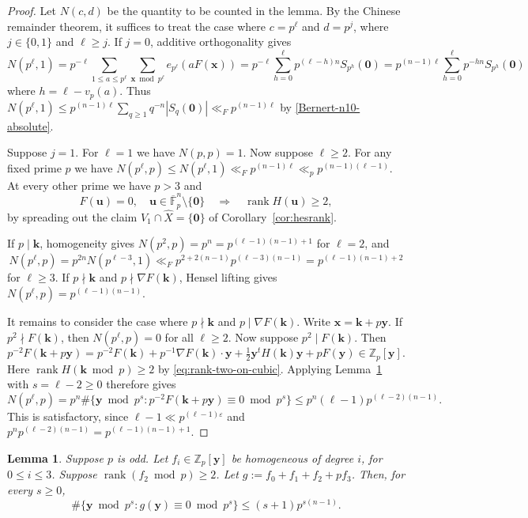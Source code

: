 \documentclass[a4paper,11pt, twoside,reqno]{amsart}
\theoremstyle{plain}
\newtheorem{lemma}[thm]{Lemma}
\theoremstyle{definition}
\theoremstyle{remark}
\newcommand{\bfx}{\bm{x}}
\newcommand{\bfy}{\bm{y}}
\newcommand{\ZZ}{\mathbb{Z}}
\DeclareMathOperator{\rank}{rank}
\renewcommand{\bar}{\overline}
\newcommand{\ve}{\varepsilon}
\renewcommand{\le}{\leqslant}
\renewcommand{\ge}{\geqslant}
\newcommand{\FF}{\mathbb{F}}
\newcommand{\cone}{\widehat}
\numberwithin{equation}{section}
\begin{document}
\begin{proof}
Let $N(c,d)$ be the quantity to be counted in the lemma.
By the Chinese remainder theorem, it suffices to treat the case where
$c=p^\ell$ and $d=p^j$, where $j\in\{0,1\}$ and $\ell\ge j$.
If $j=0$, additive orthogonality gives
\begin{equation*}
N(p^\ell,1)
= p^{-\ell} \sum_{1\le a\le p^\ell} \sum_{\bfx\bmod{p^\ell}} e_{p^\ell}(aF(\bfx))
= p^{-\ell} \sum_{h=0}^\ell p^{(\ell-h)n}S_{p^h}(\bm0)
= p^{(n-1)\ell} \sum_{h=0}^\ell p^{-hn}S_{p^h}(\bm0)
\end{equation*}
where $h = \ell - v_p(a)$.
Thus $N(p^\ell,1)
\le p^{(n-1)\ell} \sum_{q\ge 1} q^{-n} |S_q(\bm0)|
\ll_F p^{(n-1)\ell}$
by \eqref{Bernert-n10-absolute}.

Suppose $j=1$.
For $\ell=1$ we have $N(p,p)=1$.
Now suppose $\ell\ge 2$.
For any fixed prime $p$ we have
$N(p^\ell,p) \le N(p^\ell,1)
\ll_F p^{(n-1)\ell} \ll_p p^{(n-1)(\ell-1)}$.
At every other prime we have $p>3$ and
\begin{equation}\label{eq:rank-two-on-cubic}
F(\bm u)=0,\quad \bm u\in \bar{\FF}_p^n \setminus \{\bm0\}
\quad\Longrightarrow\quad \operatorname{rank}H(\bm u)\ge2,
\end{equation}
by spreading out the claim $V_1 \cap \cone X = \{\bm0\}$ of Corollary~\ref{cor:hesrank}.

If $p\mid\bm k$, homogeneity gives
$N(p^2,p) = p^n = p^{(\ell-1)(n-1)+1}$ for $\ell=2$, and
\[
N(p^\ell,p)=p^{2n}N(p^{\ell-3},1)
\ll_F p^{2+2(n-1)} p^{(\ell-3)(n-1)}
= p^{(\ell-1)(n-1)+2}
\]
for $\ell\ge3$.
If $p\nmid \bm k$ and $p\nmid\nabla F(\bm k)$, Hensel lifting gives
$N(p^\ell,p) = p^{(\ell-1)(n-1)}$.

It remains to consider the case where $p\nmid\bm k$ and $p\mid\nabla F(\bm k)$.
Write $\bm x=\bm k+p\bm y$.
If $p^2\nmid F(\bm k)$,
then $N(p^\ell,p)=0$ for all $\ell\ge 2$.
Now suppose $p^2\mid F(\bm k)$.
Then
\[
p^{-2}F(\bm k+p\bm y)
=p^{-2}F(\bm k)+p^{-1}\nabla F(\bm k)\cdot\bm y
+\tfrac12\bm y^tH(\bm k)\bm y+pF(\bm y)
\in \ZZ_p[\bfy].
\]
Here $\rank H(\bm k \bmod{p}) \ge 2$ by \eqref{eq:rank-two-on-cubic}.
Applying Lemma~\ref{LEM:rank-two-root-lifting}
with $s=\ell-2\ge 0$ therefore gives
\[
N(p^\ell,p) = p^n \#\{\bfy\bmod{p^s}: p^{-2}F(\bm k+p\bm y) \equiv 0\bmod{p^s}\}
\le p^n (\ell-1)p^{(\ell-2)(n-1)}.
\]
This is satisfactory, since $\ell-1 \ll p^{(\ell-1)\ve}$
and $p^n p^{(\ell-2)(n-1)} = p^{(\ell-1)(n-1) + 1}$.
\end{proof}


\begin{lemma}
\label{LEM:rank-two-root-lifting}
Suppose $p$ is odd.
Let $f_i\in \ZZ_p[\bfy]$ be homogeneous of degree $i$, for $0\le i\le 3$.
Suppose $\rank(f_2\bmod{p}) \ge 2$.
Let $g:=f_0+f_1+f_2+pf_3$.
Then, for every $s\ge0$,
\begin{equation}\label{eq:rank-two-root-lifting}
\#\{\bm y\bmod p^s:g(\bm y)\equiv0\bmod p^s\}
\le (s+1)p^{s(n-1)}.
\end{equation}
\end{lemma}
\end{document}

